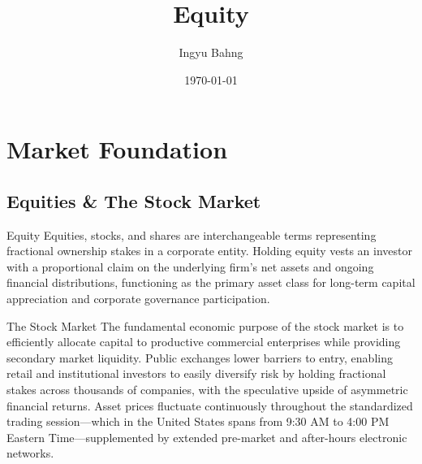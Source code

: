 \documentclass[10pt]{article}
\title{Equity}
\date{\today}
\author{Ingyu Bahng}
\begin{document}


\section{Market Foundation}

  \subsection{Equities \& The Stock Market}

    \begin{core}{Equity}
      Equities, stocks, and shares are interchangeable terms representing fractional ownership stakes in a corporate entity. Holding equity vests an investor with a proportional claim on the underlying firm's net assets and ongoing financial distributions, functioning as the primary asset class for long-term capital appreciation and corporate governance participation.
    \end{core}

    \begin{core}{The Stock Market}
      The fundamental economic purpose of the stock market is to efficiently allocate capital to productive commercial enterprises while providing secondary market liquidity. Public exchanges lower barriers to entry, enabling retail and institutional investors to easily diversify risk by holding fractional stakes across thousands of companies, with the speculative upside of asymmetric financial returns. Asset prices fluctuate continuously throughout the standardized trading session—which in the United States spans from 9:30 AM to 4:00 PM Eastern Time—supplemented by extended pre-market and after-hours electronic networks.
    \end{core}
\end{document}
